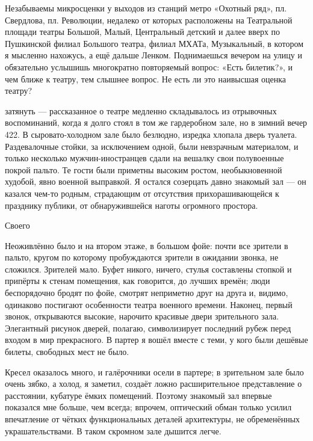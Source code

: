 \label{228-1}
Незабываемы микросценки у выходов из станций метро «Охотный ряд», пл. Свердлова, пл. Революции, недалеко от которых расположены на Театральной площади театры Большой, Малый, Центральный детский и далее вверх по Пушкинской филиал Большого театра, филиал МХАТа, Музыкальный, в котором я мысленно нахожусь, а ещё дальше Ленком. Поднимаешься вечером на улицу и обязательно услышишь многократно повторяемый вопрос: «Есть билетик?», и чем ближе к театру, тем слышнее вопрос. Не есть ли это наивысшая оценка театру?

\label{229-1}
затянуть — рассказанное о театре медленно складывалось из отрывочных воспоминаний, когда я долго стоял в том же гардеробном зале, но в зимний вечер 422. В сыровато-холодном зале было безлюдно, изредка хлопала дверь туалета. Раздевалочные стойки, за исключением одной, были невзрачным материалом, и только несколько мужчин-иностранцев сдали на вешалку свои полувоенные покрой пальто. Те гости были приметны высоким ростом, необыкновенной худобой, явно военной выправкой. Я остался созерцать давно знакомый зал — он казался чем-то родным, страдающим от отсутствия прихорашивающейся к празднику публики, от обнаружившейся наготы огромного простора.

Своего

\label{230-1}
Неоживлённо было и на втором этаже, в большом фойе: почти все зрители в пальто, кругом по которому пробуждаются зрители в ожидании звонка, не сложился. Зрителей мало. Буфет никого, ничего, стулья составлены стопкой и припёрты к стенам помещения, как говорится, до лучших времён; люди беспорядочно бродят по фойе, смотрят неприметно друг на друга и, видимо, одинаково постигают особенности театра военного времени. Наконец, первый звонок, открываются высокие, нарочито красивые двери зрительного зала. Элегантный рисунок дверей, полагаю, символизирует последний рубеж перед входом в мир прекрасного. В партер я вошёл вместе с теми, у кого были дешёвые билеты, свободных мест не было.

\label{231-1}
Кресел оказалось много, и галёрочники осели в партере; в зрительном зале было очень зябко, а холод, я заметил, создаёт ложно расширительное представление о расстоянии, кубатуре ёмких помещений. Поэтому знакомый зал впервые показался мне больше, чем всегда; впрочем, оптический обман только усилил впечатление от чётких функциональных деталей архитектуры, не обременённых украшательствами. В таком скромном зале дышится легче.

